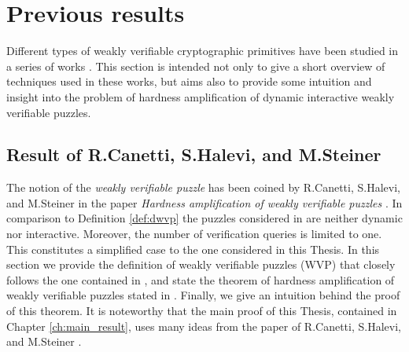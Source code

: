 \section{Previous results}
\label{st:previous_results}
Different types of weakly verifiable cryptographic primitives have been studied in a series of works
\cite{canetti2004hardness, Dodis:2009:SAI:1530441.1530450, DBLP:journals/corr/abs-1002-3534}.
This section is intended not only to give a short overview of techniques used in these works,
but aims also to provide some intuition and insight into the problem of hardness amplification
of dynamic interactive weakly verifiable puzzles.
\subsection{Result of R.Canetti, S.Halevi, and M.Steiner}
\label{subsec:chs}
The notion of the \textit{weakly verifiable puzzle} has been coined by R.Canetti, S.Halevi, and M.Steiner in the paper
\textit{Hardness amplification of weakly verifiable puzzles} \cite{canetti2004hardness}.
In comparison to Definition \ref{def:dwvp} the puzzles considered in \cite{canetti2004hardness} are neither dynamic nor interactive.
Moreover, the number of verification queries is limited to one.
This constitutes a simplified case to the one considered in this Thesis.
In this section we provide the definition of weakly verifiable puzzles (WVP) that closely follows the one contained in \cite{canetti2004hardness},
and state the theorem of hardness amplification of weakly verifiable puzzles stated in \cite{canetti2004hardness}.
Finally, we give an intuition behind the proof of this theorem.
It is noteworthy that the main proof of this Thesis, contained in Chapter \ref{ch:main_result},
uses many ideas from the paper of R.Canetti, S.Halevi, and M.Steiner \cite{canetti2004hardness}.
%

